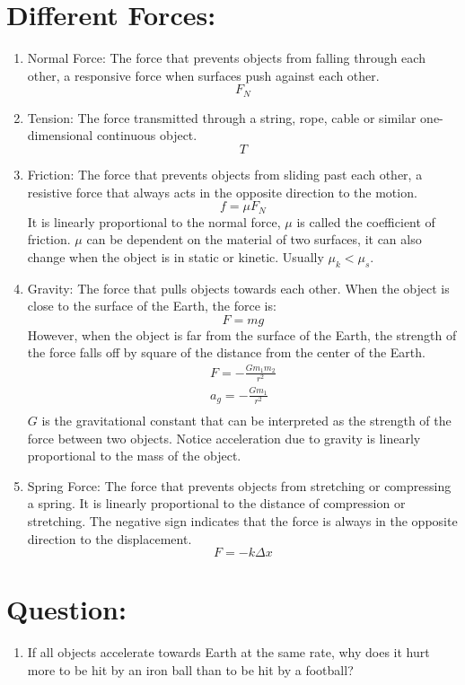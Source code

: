 \documentclass[]{article}
\begin{document}
	\section{Different Forces:}\label{sec:different-forces:}
	\begin{enumerate}
		\item Normal Force: The force that prevents objects from falling
		through each other, a responsive force when surfaces push against
		each other.
		\[F_N\]
		\item Tension: The force transmitted through a string, rope, cable or
		similar one-dimensional continuous object.
		\[T\]
		\item Friction: The force that prevents objects from sliding past
		each other, a resistive force that always acts in the opposite
		direction to the motion.
		\[f = \mu F_N\]
		It is linearly proportional to the normal force, $\mu$ is called the
		coefficient of friction. $\mu$ can be dependent on the
		material of two surfaces, it can also change when the object
		is in static or kinetic.
		Usually $\mu_k < \mu_s$.
		\item Gravity: The force that pulls objects towards each other.
		When
		the object is close to the surface of the Earth, the force is:
		\[F = mg\]
		However, when the object is far from the surface of the Earth, the
		strength of the force falls off by square of the distance from the
		center of the Earth.
		\begin{gather*}
		    F = -\frac{Gm_1m_2}{r^2}\\
		    a_g = -\frac{Gm_1}{r^2}\\
		\end{gather*}
		$G$ is the gravitational constant that can be interpreted as the
		strength of the force between two objects. Notice acceleration due to
		gravity is linearly proportional to the mass of the object.

		\item Spring Force: The force that prevents objects from stretching
		or compressing a spring. It is linearly proportional to the distance
		of compression or stretching. The negative sign indicates that the
		force is always in the opposite direction to the displacement.
		\[F = -k\Delta x\]
	\end{enumerate}
	\section{Question:}\label{sec:question:}
	\begin{enumerate}
		\item If all objects accelerate towards Earth at the same rate, why does it hurt more to be hit by an iron ball than to be hit by a football?
	\end{enumerate}
\end{document}
